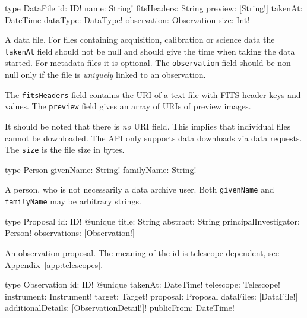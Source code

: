 
\begin{code}
type DataFile {
  id: ID!
  name: String!
  fitsHeaders: String
  preview: [String!]
  takenAt: DateTime
  dataType: DataType!
  observation: Observation
  size: Int!
}
\end{code}

A data file. For files containing acquisition, calibration or science data the \verb|takenAt| field should not be null and should give the time when taking the data started. For metadata files it is optional. The \verb|observation| field should be non-null only if the file is \emph{uniquely} linked to an observation.

The \verb|fitsHeaders| field contains the URI of a text file with FITS header keys and values. The \verb|preview| field gives an array of URIs of preview images.

\begin{note}
It should be noted that there is \emph{no} URI field. This implies that individual files cannot be downloaded. The API only supports data downloads via data requests. The \verb|size| is the file size in bytes.
\end{note}


\begin{code}
type Person {
  givenName: String!
  familyName: String!
}
\end{code}

A person, who is not necessarily a data archive user. Both \verb|givenName| and \verb|familyName| may be arbitrary strings.


\begin{code}
type Proposal {
  id: ID! @unique
  title: String
  abstract: String
  principalInvestigator: Person!
  observations: [Observation!]
}
\end{code}

An observation proposal. The meaning of the id is telescope-dependent, see Appendix~\ref{app:telescopes}.


\begin{code}
type Observation {
  id: ID! @unique
  takenAt: DateTime!
  telescope: Telescope!
  instrument: Instrument!
  target: Target!
  proposal: Proposal
  dataFiles: [DataFile!]
  additionalDetails: [ObservationDetail!]!
  publicFrom: DateTime!
}
\end{code}

